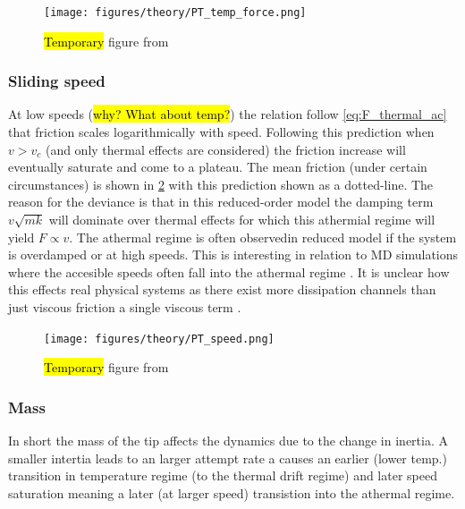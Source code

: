 \begin{figure}[H]
  \centering
  \texttt{[image: figures/theory/PT\_temp\_force.png]}
  \caption{\hl{Temporary} figure from \cite{Yalin_2011}}
  \label{fig:PT_temp_force}
\end{figure}


\subsubsection{Sliding speed}
At low speeds (\hl{why? What about temp?}) the relation follow
\cref{eq:F_thermal_ac} that friction scales logarithmically with speed.
Following this prediction when $v > v_c$ (and only thermal effects are
considered) the friction increase will eventually saturate and come to a
plateau. The mean friction (under certain circumstances) is shown in
\cref{fig:PT_speed} with this prediction shown as a dotted-line. The reason for
the deviance is that in this reduced-order model the damping term $v\sqrt{mk}$
will dominate over thermal effects for which this athermial regime will yield $F
\propto v$. The athermal regime is often observedin reduced model if the system
is overdamped or at high speeds. This is interesting in relation to
\acrshort{MD} simulations where the accesible speeds often fall into the
athermal regime \cite{Li_2011}. It is unclear how this effects real physical systems as there exist more dissipation channels than just viscous friction a single viscous term \cite{Dong_2013}.


\begin{figure}[H]
  \centering
  \texttt{[image: figures/theory/PT\_speed.png]}
  \caption{\hl{Temporary} figure from \cite{Yalin_2011}}
  \label{fig:PT_speed}
\end{figure}


\subsubsection{Mass}
In short the mass of the tip affects the dynamics due to the change in inertia. A smaller intertia leads to an larger attempt rate a causes an earlier (lower temp.) transition in temperature regime (to the thermal drift regime) and later speed saturation meaning a later (at larger speed) transistion into the athermal regime. 


